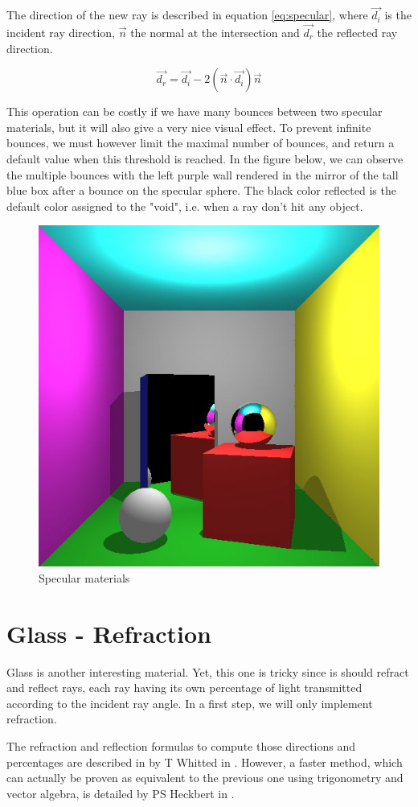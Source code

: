 The direction of the new ray is described in equation \ref{eq:specular}, where $\vec{d_i}$ is the incident ray direction, $\vec{n}$ the normal at the intersection and $\vec{d_r}$ the reflected ray direction.

\begin{equation}
\vec{d_r} = \vec{d_i} - 2 (\vec{n} \cdot \vec{d_i}) \vec{n}
\label{eq:specular}
\end{equation}

This operation can be costly if we have many bounces between two specular materials, but it will also give a very nice visual effect. To prevent infinite bounces, we must however limit the maximal number of bounces, and return a default value when this threshold is reached. In the figure below, we can observe the multiple bounces with the left purple wall rendered in the mirror of the tall blue box after a bounce on the specular sphere. The black color reflected is the default color assigned to the "void", i.e. when a ray don't hit any object.

\begin{figure}[H]
\centering
\includegraphics[width=0.35\linewidth]{img/specular.jpg}
\caption{Specular materials}
\end{figure}


\section{Glass - Refraction}
Glass is another interesting material. Yet, this one is tricky since is should refract and reflect rays, each ray having its own percentage of light transmitted according to the incident ray angle. In a first step, we will only implement refraction.

The refraction and reflection formulas to compute those directions and percentages are described in by T Whitted in \cite{whitted1979improved}. However, a faster method, which can actually be proven as equivalent to the previous one using trigonometry and vector algebra, is detailed by PS Heckbert in \cite{heckbert1989derivation}.

